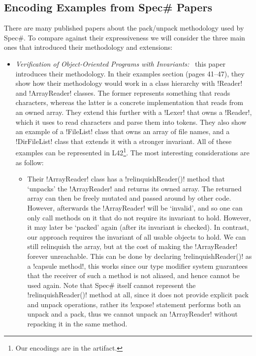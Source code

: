 \subsection{Encoding Examples from Spec\# Papers}
There are many published papers about the pack/unpack methodology used by Spec\#. To compare against their expressiveness we will consider the three main ones that introduced their methodology and extensions:
\begin{itemize}
	\item \emph{Verification of Object-Oriented Programs with Invariants:}~\cite{DBLP:journals/jot/BarnettDFLS04} this paper introduces their methodology. In their examples section (pages 41--47), they show how their methodology would work in a class hierarchy with \Q!Reader! and \Q!ArrayReader! classes. The former represents something that reads characters, whereas the latter is a concrete implementation that reads from an owned array. They extend this further with a \Q!Lexer! that owns a \Q!Reader!, which it uses to read characters and parse them into tokens. They also show an example of a \Q!FileList! class that owns an array of file names, and a \Q!DirFileList! class that extends it with a stronger invariant. All of these examples can be represented in L42\footnote{Our encodings are in the artifact.}. The most interesting considerations are as follow:
	\begin{itemize}
		\item Their \Q!ArrayReader! class has a \Q!relinquishReader()! method that `unpacks' the \Q!ArrayReader! and returns its owned array.
The returned array can then be freely mutated and passed around by other code.
However, afterwards the \Q!ArrayReader! will be `invalid', and so one can only call methods on it that do not require its invariant to hold. However, it may later be `packed' again (after its invariant is checked).
In contrast, our approach requires the invariant of all usable objects to hold.
We can still relinquish the array, but at the cost of making the \Q!ArrayReader! forever unreachable. This can be done by
 declaring \Q!relinquishReader()! as a \Q!capsule method!, this works since our type modifier system guarantees that the receiver of such a method is not aliased, and hence cannot be used again. Note that Spec\# itself cannot represent the \Q!relinquishReader()! method at all, since it does not provide explicit pack and unpack operations, rather its \Q!expose! statement performs both an unpack and a pack, thus we cannot unpack an \Q!ArrayReader! without repacking it in the same method.

\end{itemize}
\end{itemize}
